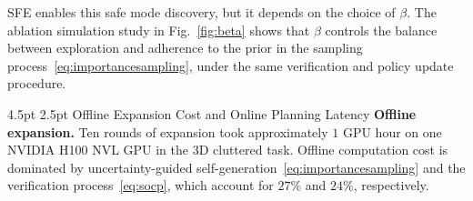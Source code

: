 \documentclass[letterpaper, 10 pt, conference]{ieeeconf}
\makeatletter
\renewcommand{\subsection}{%
  \@startsection{subsection}{2}{\z@}%
  {4.5pt}%
  {2.5pt}%
  {\normalfont\normalsize\itshape}}
\makeatother
\begin{document}
SFE enables this safe mode discovery, but it depends on the choice of $\beta$. The ablation simulation study in Fig.~\ref{fig:beta} shows that $\beta$ controls the balance between exploration and adherence to the prior in the sampling process~\eqref{eq:importancesampling}, under the same verification and policy update procedure. 

\subsection{Offline Expansion Cost and Online Planning Latency}
\noindent \textbf{Offline expansion.}
Ten rounds of expansion took approximately $1$ GPU hour on one NVIDIA H100 NVL GPU in the 3D cluttered task. 
Offline computation cost is dominated by uncertainty-guided self-generation~\eqref{eq:importancesampling} and the verification process~\eqref{eq:socp}, which account for \emph{$27\%$} and \emph{$24\%$}, respectively.
\end{document}
